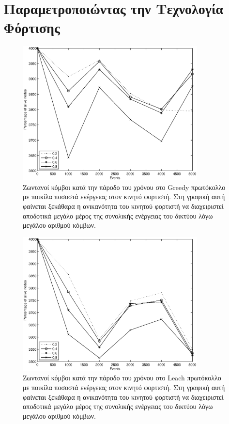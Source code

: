 \section{Παραμετροποιώντας την Τεχνολογία Φόρτισης}\label{sc:result6}

\begin{figure}[H]
  \centering
  \includegraphics[width=0.85\textwidth]{experiments/4000nodes/3.smallVSbigpercentage/alive_nodes_greedy_rc_per_our.eps}
  \caption{Ζωντανοί κόμβοι κατά την πάροδο του χρόνου στο Greedy πρωτόκολλο με ποικίλα ποσοστά ενέργειας στον κινητό φορτιστή. Στη γραφική αυτή φαίνεται ξεκάθαρα η
ανικανότητα του κινητού φορτιστή να διαχειριστεί αποδοτικά μεγάλο μέρος της συνολικής ενέργειας του δικτύου λόγω μεγάλου αριθμού κόμβων.}
  \label{fig:5_3exp_1_1}
\end{figure}

\begin{figure}[H]
  \centering
   \includegraphics[width=0.85\textwidth]{experiments/4000nodes/3.smallVSbigpercentage/alive_nodes_leach_rc_per_our.eps}
  \caption{Ζωντανοί κόμβοι κατά την πάροδο του χρόνου στο Leach πρωτόκολλο με ποικίλα ποσοστά ενέργειας στον κινητό φορτιστή. Στη γραφική αυτή φαίνεται ξεκάθαρα η
ανικανότητα του κινητού φορτιστή να διαχειριστεί αποδοτικά μεγάλο μέρος της συνολικής ενέργειας του δικτύου λόγω μεγάλου αριθμού κόμβων.}
  \label{fig:5_3exp_1_2}
\end{figure}

